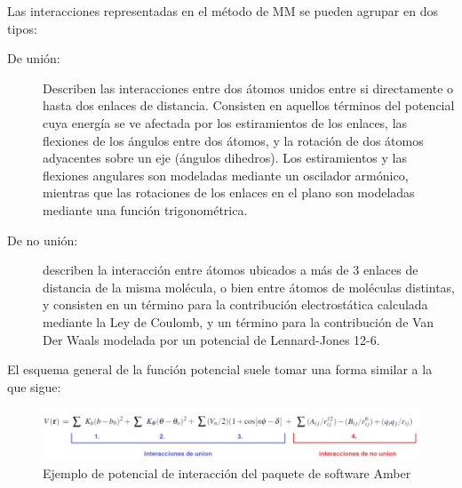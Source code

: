 Las interacciones representadas en el método de MM se pueden agrupar en dos tipos:

\begin{description}
 \item [De unión:] Describen las interacciones entre dos átomos unidos entre si directamente o hasta dos enlaces de distancia. 
 Consisten en aquellos términos del potencial cuya energía se ve afectada por los estiramientos de los enlaces, las flexiones de los ángulos entre dos átomos, y la rotación de dos átomos adyacentes sobre un eje (ángulos dihedros). Los estiramientos y las flexiones angulares son modeladas mediante un oscilador armónico, mientras que las rotaciones de los enlaces en el plano son modeladas mediante una función trigonométrica.

\item [De no unión:] describen la interacción entre átomos ubicados a más de 3 enlaces de distancia de la misma molécula, o bien entre átomos de moléculas distintas, y consisten en un término para la
contribución electrostática calculada mediante la Ley de Coulomb, y un término para la contribución de Van Der Waals modelada por un potencial de Lennard-Jones 12-6.


\end{description}



El esquema general de la función potencial suele tomar una forma similar a la que sigue: \\
\begin{figure}[!ht]
\includegraphics[keepaspectratio, width=1.0\textwidth]{img/ecPotencialAmber.png}
\caption{Ejemplo de potencial de interacción del paquete de software Amber}
\label{potencialAmber}
\end{figure}

